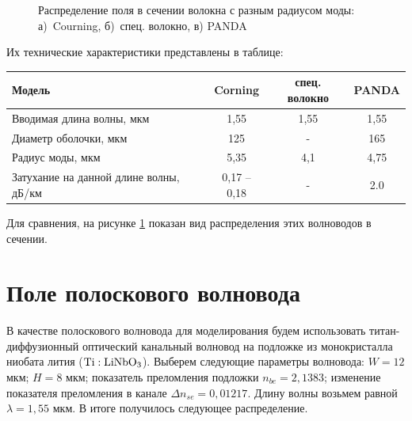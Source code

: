 \begin{figure}[h!]
	\begin{minipage}[h]{0.49\linewidth}
	\end{minipage}
	\hfill
	\begin{minipage}[h]{0.49\linewidth}
	\end{minipage}
	\vfill
	\begin{minipage}[h]{0.49\linewidth}
	\end{minipage}
	\hfill
	\begin{minipage}[h]{0.49\linewidth}
	\end{minipage}
	\caption{Распределение поля в сечении волокна с разным радиусом моды: а)~Courning, б)~спец. волокно, в) PANDA}
	\label{diameter}
\end{figure}

Их технические характеристики представлены в таблице:
\begin{center}
\begin{tabular}{|p{6cm}|c|c|c|}
\hline
Модель & Corning & спец. волокно & PANDA \\
\hline
Вводимая длина волны, мкм & 1,55 & 1,55 & 1,55 \\
\hline
Диаметр оболочки, мкм & 125 & - & 165 \\
\hline
Радиус моды, мкм & 5,35 & 4,1 & 4,75 \\
\hline
Затухание на данной длине волны, дБ/км & 0,17 – 0,18 & - & 2.0 \\
\hline
\end{tabular}
\end{center}

Для сравнения, на рисунке \ref{diameter} показан вид распределения этих волноводов в сечении.

\section{Поле полоскового волновода}
\label{strip_field}
В качестве полоскового волновода для моделирования будем использовать титан-диффузионный оптический канальный волновод на подложке из монокристалла ниобата лития ($\rm Ti:LiNbO_3$)\cite{vlada}. Выберем  следующие параметры волновода: $W=12$ мкм; $H=8$ мкм; показатель преломления подложки $n_{be}=2,1383$; изменение показателя преломления в канале $\Delta n_{se}=0,01217$. Длину волны возьмем равной $\lambda = 1,55$ мкм. В итоге получилось следующее распределение.

